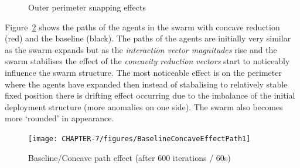 \begin{figure}[H]
\centering
{}
\caption{Outer perimeter snapping effects}
\label{fig:InducedJitter}
\end{figure}

Figure~\ref{concave:BaselineConcaveEffectPath1} shows the paths of the agents in the swarm with concave reduction (red) and the baseline (black). The paths of the agents are initially very similar as the swarm expands but as the \textit{interaction vector magnitudes} rise and the swarm stabilises the effect of the \textit{concavity reduction vectors} start to noticeably influence the swarm structure. The most noticeable effect is on the perimeter where the agents have expanded then instead of stabalising to relatively stable fixed position there is drifting effect occurring due to the imbalance of the initial deployment structure (more anomalies on one side). The swarm also becomes more `rounded' in appearance. 

\begin{figure}[H]
\begin{center}
\texttt{[image: CHAPTER-7/figures/BaselineConcaveEffectPath1]}
\end{center}
\caption{Baseline/Concave path effect (after 600 iterations / 60s)\label{concave:BaselineConcaveEffectPath1}}
\end{figure}

